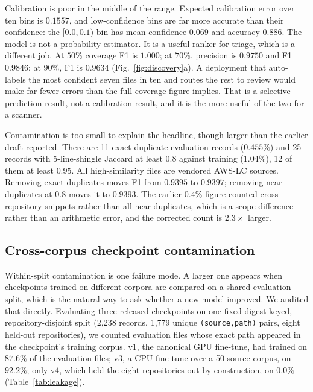 \documentclass[journal,10pt]{IEEEtran}
\begin{document}
Calibration is poor in the middle of the range. Expected calibration error over ten bins is
$0.1557$, and low-confidence bins are far more accurate than their confidence: the $[0.0,0.1)$ bin
has mean confidence $0.069$ and accuracy $0.886$. The model is not a probability estimator. It is a
useful ranker for triage, which is a different job. At $50\%$ coverage F1 is $1.000$; at $70\%$,
precision is $0.9750$ and F1 $0.9846$; at $90\%$, F1 is $0.9634$ (Fig.~\ref{fig:discovery}a). A
deployment that auto-labels the most confident seven files in ten and routes the rest to review
would make far fewer errors than the full-coverage figure implies. That is a selective-prediction
result, not a calibration result, and it is the more useful of the two for a scanner.

Contamination is too small to explain the headline, though larger than the earlier draft reported.
There are 11 exact-duplicate evaluation records ($0.455\%$) and 25 records with 5-line-shingle
Jaccard at least $0.8$ against training ($1.04\%$), 12 of them at least $0.95$. All high-similarity
files are vendored AWS-LC sources. Removing exact duplicates moves F1 from $0.9395$ to $0.9397$;
removing near-duplicates at $0.8$ moves it to $0.9393$. The earlier $0.4\%$ figure counted
cross-repository snippets rather than all near-duplicates, which is a scope difference rather than
an arithmetic error, and the corrected count is $2.3\times$ larger.

\subsection{Cross-corpus checkpoint contamination}

Within-split contamination is one failure mode. A larger one appears when checkpoints trained on
different corpora are compared on a shared evaluation split, which is the natural way to ask whether
a new model improved. We audited that directly. Evaluating three released checkpoints on one fixed
digest-keyed, repository-disjoint split (2{,}238 records, 1{,}779 unique \texttt{(source,path)}
pairs, eight held-out repositories), we counted evaluation files whose exact path appeared in the
checkpoint's training corpus. v1, the canonical GPU fine-tune, had trained on $87.6\%$ of the
evaluation files; v3, a CPU fine-tune over a 50-source corpus, on $92.2\%$; only v4, which held the
eight repositories out by construction, on $0.0\%$ (Table~\ref{tab:leakage}).
\end{document}

